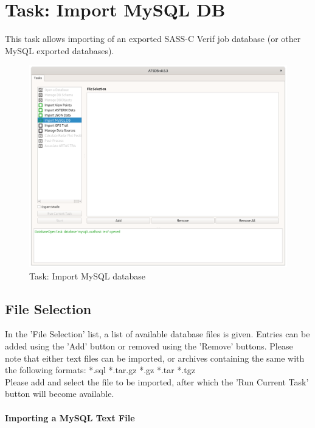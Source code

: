 \section{Task: Import MySQL DB}
\label{sec:task_import_mysql_db}

This task allows importing of an exported SASS-C Verif job database (or other MySQL exported databases).

\begin{figure}[H]
  \hspace*{-2.5cm}
    \includegraphics[width=19cm]{figures/database_import.png}
  \caption{Task: Import MySQL database}
\end{figure}

\subsection{File Selection}

In the 'File Selection' list, a list of available database files is given. Entries can be added using the 'Add' button or removed using the 'Remove' buttons. Please note that either text files can be imported, or archives containing the same with the following formats: *.sql *.tar.gz *.gz *.tar *.tgz \\

Please add and select the file to be imported, after which the 'Run Current Task' button will become available. \\

\paragraph{Importing a MySQL Text File}

